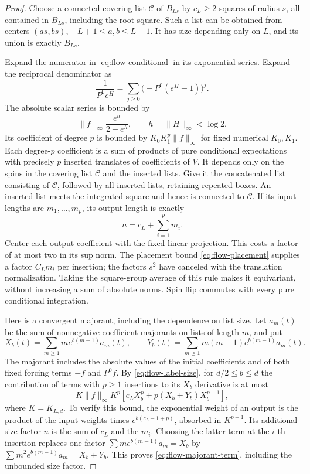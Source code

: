 \begin{proof}
Choose a connected covering list \(\mathcal C\) of \(B_{Ls}\) by
\(c_L\ge2\) squares of radius \(s\), all contained in \(B_{Ls}\), including
the root square.  Such a list can be obtained from centers
\((as,bs)\), \(-L+1\le a,b\le L-1\).  It has size depending only on
\(L\), and its union is exactly \(B_{Ls}\).

Expand the numerator in \eqref{eq:flow-conditional} in its exponential
series.  Expand the reciprocal denominator as
\[
 \frac1{P^0e^H}
 =\sum_{j\ge0}\bigl(-P^0(e^H-1)\bigr)^j.
\]
The absolute scalar series is bounded by
\[
 \|f\|_\infty\frac{e^h}{2-e^h},\qquad
 h=\|H\|_\infty<\log2.
\]
Its coefficient of degree \(p\) is bounded by \(K_0K_1^p\|f\|_\infty\)
for fixed numerical \(K_0,K_1\).  Each degree-\(p\) coefficient is a sum
of products of pure conditional expectations with precisely \(p\)
inserted translates of coefficients of \(V\).  It depends only on the
spins in the covering list \(\mathcal C\) and the inserted lists.  Give it
the concatenated list consisting of \(\mathcal C\), followed by all
inserted lists, retaining repeated boxes.  An inserted list meets the
integrated square and hence is connected to \(\mathcal C\).  If its input
lengths are \(m_1,\ldots,m_p\), its output length is exactly
\begin{equation}\label{eq:flow-label-size}
 n=c_L+\sum_{i=1}^p m_i.
\end{equation}
Center each output coefficient with the fixed linear projection.  This
costs a factor of at most two in its sup norm.  The placement bound
\eqref{eq:flow-placement} supplies a factor \(C_Lm_i\) per insertion;
the factors \(s^2\) have canceled with the translation normalization.
Taking the square-group average of this rule makes it equivariant, without
increasing a sum of absolute norms.  Spin flip commutes with every pure
conditional integration.

Here is a convergent majorant, including the dependence on list size.
Let \(a_m(t)\) be the sum of nonnegative coefficient majorants on lists of
length \(m\), and put
\[
 X_b(t)=\sum_{m\ge1}m e^{b(m-1)}a_m(t),\qquad
 Y_b(t)=\sum_{m\ge1}m(m-1)e^{b(m-1)}a_m(t).
\]
The majorant includes the absolute values of the initial coefficients and
of both fixed forcing terms \(-f\) and \(P^0f\).  By
\eqref{eq:flow-label-size}, for \(d/2\le b\le d\) the contribution of
terms with \(p\ge1\) insertions to its \(X_b\) derivative is at most
\begin{equation}\label{eq:flow-majorant-term}
 K\|f\|_\infty K^p
 \left[c_L X_b^p+p(X_b+Y_b)X_b^{p-1}\right],
\end{equation}
where \(K=K_{L,d}\).  To verify this bound, the exponential weight of an
output is the product of the input weights times
\(e^{b(c_L-1+p)}\), absorbed in \(K^{p+1}\).  Its additional size factor
\(n\) is the sum of \(c_L\) and the \(m_i\).  Choosing the latter term
at the \(i\)-th insertion replaces one factor
\(\sum m e^{b(m-1)}a_m=X_b\) by
\(\sum m^2 e^{b(m-1)}a_m=X_b+Y_b\).  This proves
\eqref{eq:flow-majorant-term}, including the unbounded size factor.


\end{proof}
